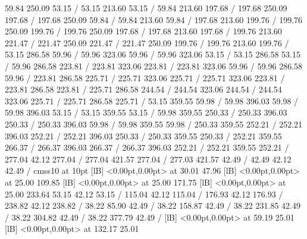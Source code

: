 { 59.84 250.09 53.15 /
 53.15 213.60 53.15 /
\setsolid
{} 59.84 213.60 197.68 /
 197.68 250.09 197.68 /
 197.68 250.09 59.84 /
 59.84 213.60 59.84 /
\setsolid
{} 197.68 213.60 199.76 /
 199.76 250.09 199.76 /
 199.76 250.09 197.68 /
 197.68 213.60 197.68 /
\setsolid
{} 199.76 213.60 221.47 /
 221.47 250.09 221.47 /
 221.47 250.09 199.76 /
 199.76 213.60 199.76 /
\setsolid
{} 53.15 286.58 59.96 /
 59.96 323.06 59.96 /
 59.96 323.06 53.15 /
 53.15 286.58 53.15 /
\setsolid
{} 59.96 286.58 223.81 /
 223.81 323.06 223.81 /
 223.81 323.06 59.96 /
 59.96 286.58 59.96 /
\setsolid
{} 223.81 286.58 225.71 /
 225.71 323.06 225.71 /
 225.71 323.06 223.81 /
 223.81 286.58 223.81 /
\setsolid
{} 225.71 286.58 244.54 /
 244.54 323.06 244.54 /
 244.54 323.06 225.71 /
 225.71 286.58 225.71 /
\setsolid
{} 53.15 359.55 59.98 /
 59.98 396.03 59.98 /
 59.98 396.03 53.15 /
 53.15 359.55 53.15 /
\setsolid
{} 59.98 359.55 250.33 /
 250.33 396.03 250.33 /
 250.33 396.03 59.98 /
 59.98 359.55 59.98 /
\setsolid
{} 250.33 359.55 252.21 /
 252.21 396.03 252.21 /
 252.21 396.03 250.33 /
 250.33 359.55 250.33 /
\setsolid
{} 252.21 359.55 266.37 /
 266.37 396.03 266.37 /
 266.37 396.03 252.21 /
 252.21 359.55 252.21 /
\setsolid
{} 277.04 42.12 277.04 /
 277.04 421.57 277.04 /
 277.03 421.57 42.49 /
 42.49 42.12 42.49 /
\font\picfont cmss10 at 10pt\picfont
{}  [lB] <0.00pt,0.00pt> at 30.01 47.96
  [lB] <0.00pt,0.00pt> at 25.00 109.85
  [lB] <0.00pt,0.00pt> at 25.00 171.75
  [lB] <0.00pt,0.00pt> at 25.00 233.64
\setsolid
{} 53.15 42.12 53.15 /
\setsolid
{} 115.04 42.12 115.04 /
\setsolid
{} 176.93 42.12 176.93 /
\setsolid
{} 238.82 42.12 238.82 /
\setsolid
{} 38.22 85.90 42.49 /
\setsolid
{} 38.22 158.87 42.49 /
\setsolid
{} 38.22 231.85 42.49 /
\setsolid
{} 38.22 304.82 42.49 /
\setsolid
{} 38.22 377.79 42.49 /
  [lB] <0.00pt,0.00pt> at 59.19 25.01
  [lB] <0.00pt,0.00pt> at 132.17 25.01
}
